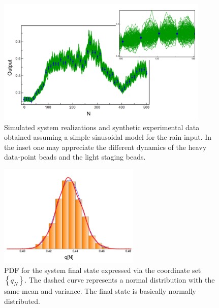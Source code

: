 \documentclass[11pt, a4paper]{article}
\begin{document}
\begin{figure}
    \centering
    \includegraphics[width=0.9\textwidth]{Figs/FigSpaghetti.png}
    \caption{Simulated system realizations and synthetic experimental data obtained assuming a simple sinusoidal model for the rain input. In the inset one may appreciate the different dynamics of the heavy data-point beads and the light staging beads.}
    \label{fig:spaghetti}
\end{figure}

\begin{figure}
    \centering
    \includegraphics[width=0.6\textwidth]{Figs/FigFinalState.png}
    \caption{PDF for the system final state expressed via the coordinate set $\left\{ q_N \right\}$. The dashed curve represents a normal distribution with the same mean and variance. The final state is basically normally distributed.}
    \label{fig:final_state}
\end{figure}
\end{document}
